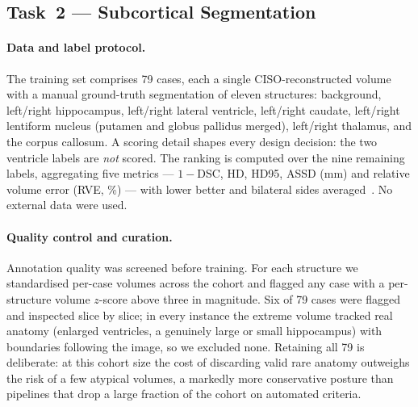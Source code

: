 \documentclass[runningheads]{llncs}
\begin{document}
\subsection{Task~2 --- Subcortical Segmentation}
\label{sec:m2}

\paragraph{Data and label protocol.}
The training set comprises 79 cases, each a single CISO-reconstructed volume with
a manual ground-truth segmentation of eleven structures: background, left/right
hippocampus, left/right lateral ventricle, left/right caudate, left/right
lentiform nucleus (putamen and globus pallidus merged), left/right thalamus, and
the corpus callosum. A scoring detail shapes every design decision: the two
ventricle labels are \emph{not} scored. The ranking is computed over the nine
remaining labels, aggregating five metrics --- $1-$DSC, HD, HD95, ASSD (mm) and
relative volume error (RVE, \%) --- with lower better and bilateral sides
averaged~\cite{maierhein2024metrics}. No external data were used.

\paragraph{Quality control and curation.}
Annotation quality was screened before training. For each structure we
standardised per-case volumes across the cohort and flagged any case with a
per-structure volume $z$-score above three in magnitude. Six of 79 cases were
flagged and inspected slice by slice; in every instance the extreme volume
tracked real anatomy (enlarged ventricles, a genuinely large or small
hippocampus) with boundaries following the image, so we excluded none. Retaining
all 79 is deliberate: at this cohort size the cost of discarding valid rare
anatomy outweighs the risk of a few atypical volumes, a markedly more
conservative posture than pipelines that drop a large fraction of the cohort on
automated criteria.
\end{document}
